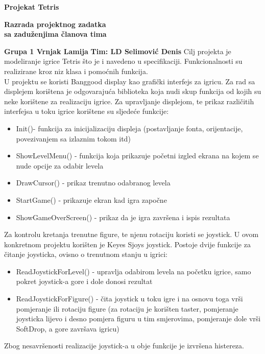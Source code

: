 \documentclass[a4paper,12pt,twoside]{article}
\begin{document}
\begin{center}
{\Huge \bf Projekat Tetris } \\
\vspace*{0.5cm}

{\Large \bf Razrada projektnog zadatka\\ sa zaduženjima članova tima} \\
\end{center}
{\large \bf Grupa 1 \hfill Vrnjak Lamija} \linebreak
{\large \bf Tim: LD \hfill Selimović Denis} \linebreak
\linebreak
Cilj projekta je modeliranje igrice Tetris što je i navedeno u specifikaciji. Funkcionalnosti su realizirane kroz niz klasa i pomoćnih funkcija. \\
U projektu se koristi Banggood display kao grafički interfejs za igricu. Za rad sa displejem korištena je odgovarajuća biblioteka koja nudi skup funkcija od kojih su neke korištene za realizaciju igrice. Za upravljanje displejom, te prikaz različitih interfejsa u toku igrice korištene su sljedeće funkcije:
\begin{itemize}
\item Init()- funkcija za inicijalizaciju displeja (postavljanje fonta, orijentacije, povezivanjem sa izlaznim tokom itd)
\item ShowLevelMenu() - funkcija koja prikazuje početni izgled ekrana na kojem se nude opcije za odabir levela
\item DrawCursor() - prikaz trenutno odabranog levela
\item StartGame() - prikazuje ekran kad igra započne
\item ShowGameOverScreen() - prikaz da je igra završena i ispis rezultata
\end{itemize}
Za kontrolu kretanja trenutne figure, te njenu rotaciju koristi se joystick. U ovom konkretnom projektu korišten je Keyes Sjoys joystick. Postoje dvije funkcije za čitanje joysticka, ovisno o trenutnom stanju u igrici:
\begin{itemize}
\item ReadJoystickForLevel() - upravlja odabirom levela na početku igrice, samo pokret joystick-a gore i dole donosi rezultat
\item ReadJoystickForFigure() - čita joystick u toku igre i na osnovu toga vrši pomjeranje ili rotaciju figure (za rotaciju je korišten taster, pomjeranje joysticka lijevo i desno pomjera figuru u tim smjerovima, pomjeranje dole vrši SoftDrop, a gore završava igricu)
\end{itemize}
Zbog nesavršenosti realizacije joystick-a u obje funkcije je izvršena histereza. \\
\end{document}
